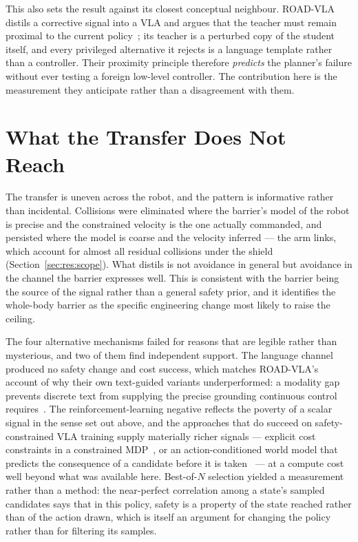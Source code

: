 This also sets the result against its closest conceptual neighbour. ROAD-VLA distils a corrective
signal into a VLA and argues that the teacher must remain proximal to the current
policy~\cite{wang2026roadvla}; its teacher is a perturbed copy of the student itself, and every
privileged alternative it rejects is a language template rather than a controller. Their proximity
principle therefore \emph{predicts} the planner's failure without ever testing a foreign low-level
controller. The contribution here is the measurement they anticipate rather than a disagreement
with them.

\section{What the Transfer Does Not Reach}\label{sec:disc:limits}

The transfer is uneven across the robot, and the pattern is informative rather than incidental.
Collisions were eliminated where the barrier's model of the robot is precise and the constrained
velocity is the one actually commanded, and persisted where the model is coarse and the velocity
inferred --- the arm links, which account for almost all residual collisions under the shield
(Section~\ref{sec:res:scope}). What distils is not avoidance in general but avoidance in the
channel the barrier expresses well. This is consistent with the barrier being the source of the
signal rather than a general safety prior, and it identifies the whole-body barrier as the specific
engineering change most likely to raise the ceiling.

The four alternative mechanisms failed for reasons that are legible rather than mysterious, and two
of them find independent support. The language channel produced no safety change and cost success,
which matches ROAD-VLA's account of why their own text-guided variants underperformed: a modality
gap prevents discrete text from supplying the precise grounding continuous control
requires~\cite{wang2026roadvla}. The reinforcement-learning negative reflects the poverty of a
scalar signal in the sense set out above, and the approaches that do succeed on safety-constrained
VLA training supply materially richer signals --- explicit cost constraints in a constrained
MDP~\cite{safevla}, or an action-conditioned world model that predicts the consequence of a
candidate before it is taken~\cite{safedojo} --- at a compute cost well beyond what was available
here. Best-of-$N$ selection yielded a measurement rather than a method: the near-perfect
correlation among a state's sampled candidates says that in this policy, safety is a property of
the state reached rather than of the action drawn, which is itself an argument for changing the
policy rather than for filtering its samples.

